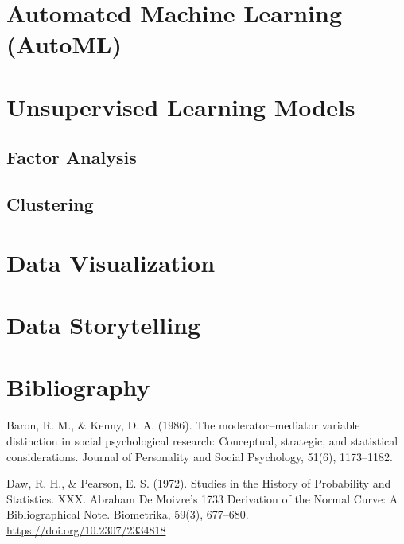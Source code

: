\documentclass[]{book}
\begin{document}
\hypertarget{automated-machine-learning-automl}{%
\chapter{Automated Machine Learning (AutoML)}\label{automated-machine-learning-automl}}

\hypertarget{unsupervised-learning-models}{%
\chapter{Unsupervised Learning Models}\label{unsupervised-learning-models}}

\hypertarget{factor-analysis}{%
\section{Factor Analysis}\label{factor-analysis}}

\hypertarget{clustering}{%
\section{Clustering}\label{clustering}}

\hypertarget{data-visualization}{%
\chapter{Data Visualization}\label{data-visualization}}

\hypertarget{data-storytelling}{%
\chapter{Data Storytelling}\label{data-storytelling}}

\hypertarget{bibliography}{%
\chapter{Bibliography}\label{bibliography}}

Baron, R. M., \& Kenny, D. A. (1986). The moderator--mediator variable distinction in social psychological research: Conceptual, strategic, and statistical considerations. Journal of Personality and Social Psychology, 51(6), 1173--1182.

Daw, R. H., \& Pearson, E. S. (1972). Studies in the History of Probability and Statistics. XXX. Abraham De Moivre's 1733 Derivation of the Normal Curve: A Bibliographical Note. Biometrika, 59(3), 677--680. \url{https://doi.org/10.2307/2334818}
\end{document}

